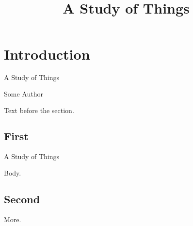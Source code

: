 \documentclass{report}
\title{A Study of Things}
\begin{document}
\chapter{Introduction}
\begin{center}{\LARGE A Study of Things}\end{center}
\begin{center}{\large Some Author}\end{center}
Text before the section.
\section{First}
\begin{center}{\LARGE A Study of Things}\end{center}
Body.
\section{Second}
More.
\end{document}
